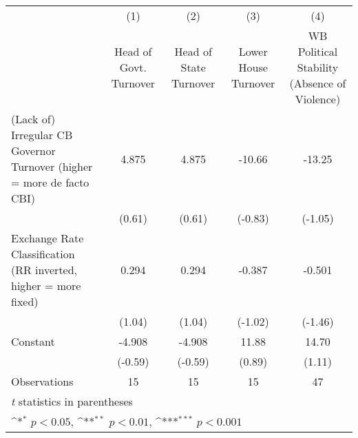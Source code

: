 {
\def\sym#1{\ifmmode^{#1}\else\(^{#1}\)\fi}
\begin{tabular*}{\linewidth}{@{\hskip\tabcolsep\extracolsep\fill}l*{4}{c}}
\hline\hline
                &\multicolumn{1}{c}{(1)}&\multicolumn{1}{c}{(2)}&\multicolumn{1}{c}{(3)}&\multicolumn{1}{c}{(4)}\\
                &\multicolumn{1}{c}{Head of Govt. Turnover}&\multicolumn{1}{c}{Head of State Turnover}&\multicolumn{1}{c}{Lower House Turnover}&\multicolumn{1}{c}{WB Political Stability (Absence of Violence)}\\
\hline
(Lack of) Irregular CB Governor Turnover (higher = more de facto CBI)&    4.875         &    4.875         &   -10.66         &   -13.25         \\
                &   (0.61)         &   (0.61)         &  (-0.83)         &  (-1.05)         \\
[1em]
Exchange Rate Classification (RR inverted, higher = more fixed)&    0.294         &    0.294         &   -0.387         &   -0.501         \\
                &   (1.04)         &   (1.04)         &  (-1.02)         &  (-1.46)         \\
[1em]
Constant        &   -4.908         &   -4.908         &    11.88         &    14.70         \\
                &  (-0.59)         &  (-0.59)         &   (0.89)         &   (1.11)         \\
\hline
Observations    &       15         &       15         &       15         &       47         \\
\hline\hline
\multicolumn{5}{l}{\footnotesize \textit{t} statistics in parentheses}\\
\multicolumn{5}{l}{\footnotesize \sym{*} \(p<0.05\), \sym{**} \(p<0.01\), \sym{***} \(p<0.001\)}\\
\end{tabular*}
}
